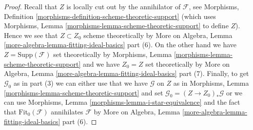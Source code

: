 \documentclass[10pt,a4paper]{amsart}
\theoremstyle{plain}
\theoremstyle{definition}
\theoremstyle{remark}
\numberwithin{equation}{subsection}
\begin{document}
\begin{proof}
Recall that $Z$ is locally cut out by the annihilator of $\mathcal{F}$, see
Morphisms, Definition \ref{morphisms-definition-scheme-theoretic-support}
(which uses Morphisms, Lemma \ref{morphisms-lemma-scheme-theoretic-support}
to define $Z$). Hence we see that $Z \subset Z_0$ scheme theoretically
by More on Algebra, Lemma
\ref{more-algebra-lemma-fitting-ideal-basics} part (6).
On the other hand we have $Z = \text{Supp}(\mathcal{F})$
set theoretically by
Morphisms, Lemma \ref{morphisms-lemma-scheme-theoretic-support}
and we have $Z_0 = Z$ set theoretically by
More on Algebra, Lemma
\ref{more-algebra-lemma-fitting-ideal-basics} part (7).
Finally, to get $\mathcal{G}_0$ as in part (3) we can either use
that we have $\mathcal{G}$ on $Z$ as in
Morphisms, Lemma \ref{morphisms-lemma-scheme-theoretic-support}
and set $\mathcal{G}_0 = (Z \to Z_0)_*\mathcal{G}$
or we can use Morphisms, Lemma \ref{morphisms-lemma-i-star-equivalence}
and the fact that $\text{Fit}_0(\mathcal{F})$ annihilates
$\mathcal{F}$ by More on Algebra, Lemma
\ref{more-algebra-lemma-fitting-ideal-basics} part (6).
\end{proof}
\end{document}
